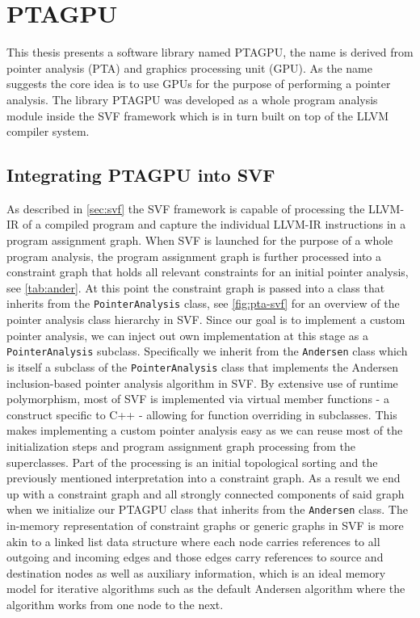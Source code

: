 \chapter{PTAGPU} \label{chap:main}
This thesis presents a software library named PTAGPU, the name is derived from pointer analysis (PTA) and graphics processing unit (GPU).
As the name suggests the core idea is to use GPUs for the purpose of performing a pointer analysis.
The library PTAGPU was developed as a whole program analysis module inside the SVF framework which is in turn built on top of the LLVM compiler system.
\section{Integrating PTAGPU into SVF}\label{sec:integsvf}
As described in \autoref{sec:svf} the SVF framework is capable of processing the LLVM-IR of a compiled program and capture the individual LLVM-IR instructions in a program assignment graph.
When SVF is launched for the purpose of a whole program analysis, the program assignment graph is further processed into a constraint graph that holds all relevant constraints for an initial pointer analysis, see \autoref{tab:ander}.
At this point the constraint graph is passed into a class that inherits from the \verb|PointerAnalysis| class, see \autoref{fig:pta-svf} for an overview of the pointer analysis class hierarchy in SVF.
Since our goal is to implement a custom pointer analysis, we can inject out own implementation at this stage as a \verb|PointerAnalysis| subclass.
Specifically we inherit from the \verb|Andersen| class which is itself a subclass of the \verb|PointerAnalysis| class that implements the Andersen inclusion-based pointer analysis algorithm in SVF.
By extensive use of runtime polymorphism, most of SVF is implemented via virtual member functions - a construct specific to C++ - allowing for function overriding in subclasses. This makes implementing a custom pointer analysis easy as we can reuse most of the initialization steps and program assignment graph processing from the superclasses. Part of the processing is an initial topological sorting and the previously mentioned interpretation into a constraint graph.
As a result we end up with a constraint graph and all strongly connected components of said graph when we initialize our PTAGPU class that inherits from the \verb|Andersen| class.
The in-memory representation of constraint graphs or generic graphs in SVF is more akin to a linked list data structure where each node carries references to all outgoing and incoming edges and those edges carry references to source and destination nodes as well as auxiliary information, which is an ideal memory model for iterative algorithms such as the default Andersen algorithm where the algorithm works from one node to the next.
